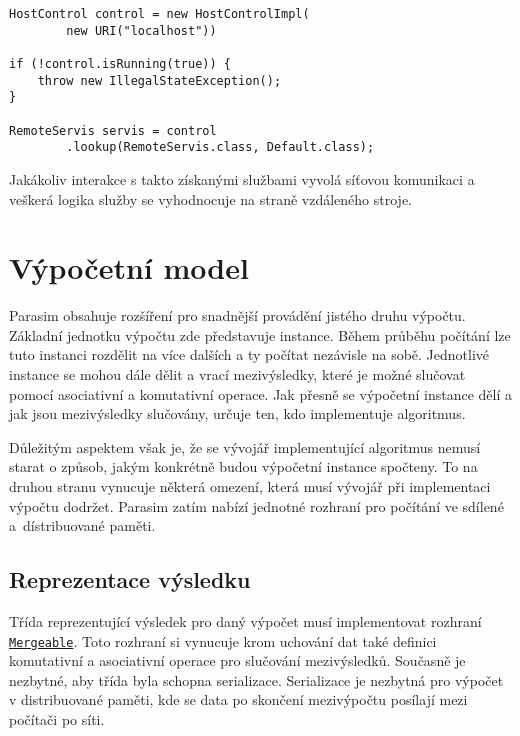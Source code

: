 \begin{lstlisting}[label={code:host:control}, caption={Přístup ke vzdálenému serveru}, style=Java]
HostControl control = new HostControlImpl(
		new URI("localhost"))

if (!control.isRunning(true)) {
	throw new IllegalStateException();
}

RemoteServis servis = control
		.lookup(RemoteServis.class, Default.class);
\end{lstlisting}

Jakákoliv interakce s takto získanými službami vyvolá síťovou komunikaci a veškerá logika
služby se vyhodnocuje na straně vzdáleného stroje.

\section{Výpočetní model}

Parasim obsahuje rozšíření pro snadnější provádění jistého druhu vý\-poč\-tu.
Základní jednotku výpočtu zde představuje instance. Během průběhu po\-čí\-tá\-ní lze
tuto instanci rozdělit na více dalších a ty počítat nezávisle na sobě. Jednotlivé instance
se mohou dále dělit a vrací mezivýsledky, které je možné slučovat pomocí asociativní
a komutativní operace. Jak přesně se výpočetní instance dělí a jak jsou mezivýsledky
slučovány, určuje ten, kdo implementuje algoritmus.

Důležitým aspektem však je, že se vývojář implementující algoritmus nemusí starat
o způsob, jakým konkrétně budou výpočetní instance spoč\-te\-ny. To na druhou stranu vynucuje
některá omezení, která musí vývojář při implementaci výpočtu dodržet.  Parasim zatím nabízí
jednotné rozhraní pro počítání ve sdílené a~dís\-tri\-buo\-va\-né paměti.

\subsection{Reprezentace výsledku}

Třída reprezentující výsledek pro daný výpočet musí implementovat rozhraní \href{https://github.com/sybila/parasim/blob/2.0.0.Final/model/core/src/main/java/org/sybila/parasim/model/Mergeable.java}{\texttt{Mergeable}}. Toto rozhraní si vynucuje krom uchování dat také definici komutativní
a asociativní operace pro slučování mezivýsledků. Sou\-čas\-ně je nezbytné, aby třída
byla schopna serializace. Serializace je nezbytná pro výpočet v dis\-tri\-buo\-va\-né paměti,
kde se data po skončení mezivýpočtu po\-sí\-la\-jí mezi počítači po síti.

